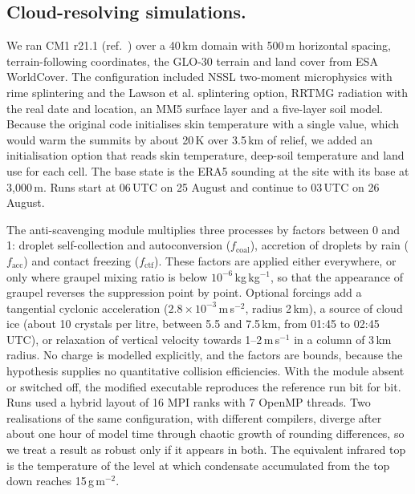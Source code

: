 \documentclass{nature}
\begin{document}
\begin{methods}
\subsection{Cloud-resolving simulations.}
We ran CM1 r21.1 (ref.~) over a 40\,km domain with 500\,m horizontal spacing, terrain-following coordinates, the GLO-30 terrain and land cover from ESA WorldCover. The configuration included NSSL two-moment microphysics\cite{mansell2010} with rime splintering and the Lawson et al. splintering option\cite{lawson2015}, RRTMG radiation\cite{iacono2008} with the real date and location, an MM5 surface layer and a five-layer soil model. Because the original code initialises skin temperature with a single value, which would warm the summits by about 20\,K over 3.5\,km of relief, we added an initialisation option that reads skin temperature, deep-soil temperature and land use for each cell. The base state is the ERA5 sounding at the site with its base at 3,000\,m. Runs start at 06\,UTC on 25 August and continue to 03\,UTC on 26 August.

The anti-scavenging module multiplies three processes by factors between 0 and 1: droplet self-collection and autoconversion ($f_\mathrm{coal}$), accretion of droplets by rain ($f_\mathrm{acc}$) and contact freezing ($f_\mathrm{ctf}$). These factors are applied either everywhere, or only where graupel mixing ratio is below $10^{-6}$\,kg\,kg$^{-1}$, so that the appearance of graupel reverses the suppression point by point. Optional forcings add a tangential cyclonic acceleration ($2.8\times10^{-3}$\,m\,s$^{-2}$, radius 2\,km), a source of cloud ice (about 10 crystals per litre, between 5.5 and 7.5\,km, from 01:45 to 02:45\,UTC), or relaxation of vertical velocity towards 1--2\,m\,s$^{-1}$ in a column of 3\,km radius. No charge is modelled explicitly, and the factors are bounds, because the hypothesis supplies no quantitative collision efficiencies. With the module absent or switched off, the modified executable reproduces the reference run bit for bit. Runs used a hybrid layout of 16 MPI ranks with 7 OpenMP threads. Two realisations of the same configuration, with different compilers, diverge after about one hour of model time through chaotic growth of rounding differences, so we treat a result as robust only if it appears in both. The equivalent infrared top is the temperature of the level at which condensate accumulated from the top down reaches 15\,g\,m$^{-2}$.


\end{methods}
\end{document}
